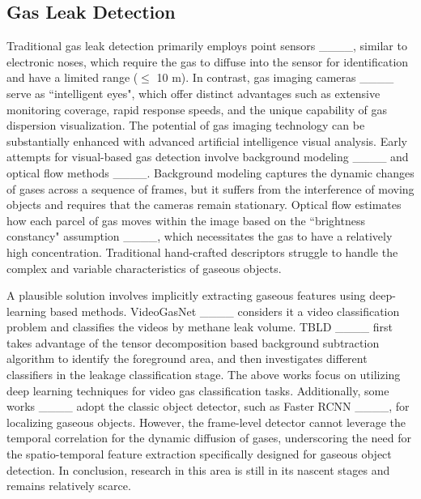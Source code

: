 \subsection{Gas Leak Detection}
Traditional gas leak detection primarily employs point sensors ____, similar to electronic noses, which require the gas to diffuse into the sensor for identification and have a limited range ($\leq$ 10 m). In contrast,  gas imaging cameras ____ serve as ``intelligent eyes", which offer distinct advantages such as extensive monitoring coverage, rapid response speeds, and the unique capability of gas dispersion visualization. The potential of gas imaging technology can be substantially enhanced  with advanced artificial intelligence visual analysis. Early attempts for visual-based gas detection involve background modeling ____ and optical flow methods ____. Background modeling  captures the dynamic changes of gases across a sequence of frames, but it suffers from the interference of moving objects and requires that the cameras remain stationary. Optical flow estimates how each parcel of gas moves within the image based on the ``brightness constancy" assumption ____, which necessitates the gas to have a relatively high concentration. Traditional hand-crafted descriptors struggle to handle the complex and variable characteristics of gaseous objects.

A plausible solution involves implicitly extracting gaseous features using deep-learning based methods. VideoGasNet ____ considers it a video classification problem and classifies the videos by methane leak volume. TBLD ____ first takes advantage of the tensor decomposition based background subtraction algorithm to identify the foreground area, and then investigates different classifiers in the leakage classification stage. The above works focus on utilizing deep learning techniques for video gas classification tasks.  Additionally, some works ____ adopt the classic object detector, such as Faster RCNN ____, for localizing gaseous objects. However, the frame-level detector cannot leverage the temporal correlation for the dynamic diffusion of gases, underscoring the need for the spatio-temporal feature extraction specifically designed for gaseous object detection. In conclusion,  research in this area is still in its nascent stages and remains relatively scarce.


